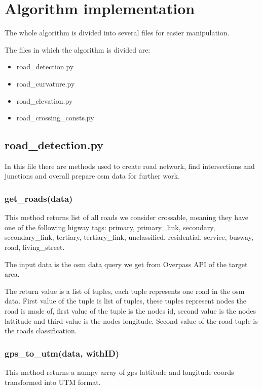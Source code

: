 \documentclass[oneside]{article}
\begin{document}
    \newpage
    \section{Algorithm implementation}
    The whole algorithm is divided into several files for easier manipulation.

    \noindent The files in which the algorithm is divided are:
    \begin{itemize}
        \item road\_detection.py
        \item road\_curvature.py
        \item road\_elevation.py
        \item road\_crossing\_consts.py
    \end{itemize}

        \subsection{road\_detection.py}
        In this file there are methods used to create road network, find intersections and junctions and overall prepare osm data for further work.

            \subsubsection{get\_roads(data)}
            This method returns list of all roads we consider crossable, meaning they have one of the following higway tags: primary, primary\_link, secondary, secondary\_link, tertiary, tertiary\_link, unclassified, residential, service, busway, road, living\_street.

            The input data is the osm data query we get from Overpass API of the target area.

            The return value is a list of tuples, each tuple represents one road in the osm data. First value of the tuple is list of tuples, these tuples represent nodes the road is made of, first value of the tuple is the nodes id, second value is the nodes lattitude and third value is the nodes longitude. Second value of the road tuple is the roads classification.

            \subsubsection{gps\_to\_utm(data, withID)}
            This method returns a numpy array of gps lattitude and longitude coords transformed into UTM format.
\end{document}
